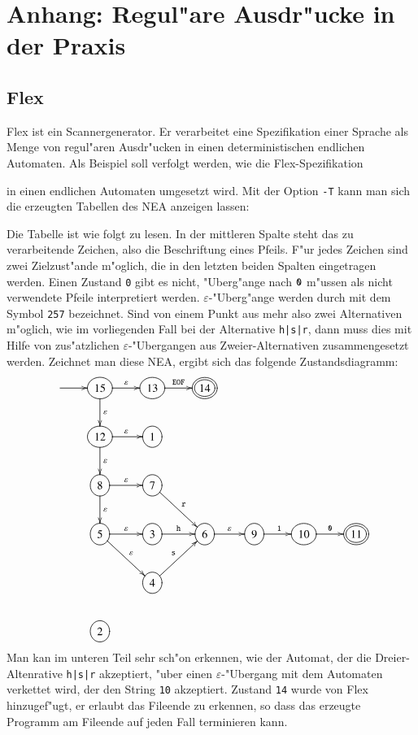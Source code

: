 \section{Anhang: Regul"are Ausdr"ucke in der Praxis\label{regulaer:praxis}}
\subsection{Flex}
Flex ist ein Scannergenerator. Er verarbeitet eine Spezifikation einer
Sprache als Menge von regul"aren Ausdr"ucken in einen deterministischen 
endlichen Automaten. Als Beispiel soll verfolgt werden, wie die
Flex-Spezifikation

in einen endlichen Automaten umgesetzt wird. Mit der Option {\tt -T}
kann man sich die erzeugten Tabellen des NEA anzeigen lassen:

Die Tabelle ist wie folgt zu lesen.
In der mittleren Spalte steht das zu verarbeitende Zeichen, also
die Beschriftung eines Pfeils. F"ur jedes Zeichen sind zwei Zielzust"ande
m"oglich, die in den letzten beiden Spalten eingetragen werden. Einen
Zustand {\tt 0} gibt es nicht, "Uberg"ange nach ${\tt 0}$ m"ussen als
nicht verwendete Pfeile interpretiert werden. $\varepsilon$-"Uberg"ange
werden durch mit dem Symbol {\tt 257} bezeichnet. Sind von einem Punkt
aus mehr also zwei Alternativen m"oglich, wie im vorliegenden Fall
bei der Alternative {\tt h|s|r}, dann muss dies mit Hilfe von zus"atzlichen
$\varepsilon$-"Ubergangen aus Zweier-Alternativen zusammengesetzt werden.
Zeichnet man diese NEA, ergibt sich das folgende Zustandsdiagramm:
\[
\entrymodifiers={++[o][F]}
\xymatrix{
*+\txt{}\ar[r]
	&{15} \ar[r]^{\varepsilon} \ar[d]^{\varepsilon}
		&{13}\ar[r]^{{\tt EOF}}
			&*++[o][F=]{14}
\\
*+\txt{}
	&{12}\ar[d]^{\varepsilon} \ar[r]^{\varepsilon}
		&{1}
\\
*+\txt{}
	&{8}\ar[d]^{\varepsilon} \ar[r]^{\varepsilon}
		&{7}\ar[dr]^{\tt r}
\\
*+\txt{}
	&{5}\ar[dr]^{\varepsilon} \ar[r]^{\varepsilon}
		&{3}\ar[r]^{\tt h}
			&{6}\ar[r]^{\varepsilon}
				&{9}\ar[r]^{\tt 1}
					&{10}\ar[r]^{\tt 0}
						&*++[o][F=]{11}
\\
*+\txt{}
	&*+\txt{}
		&{4}\ar[ur]^{\tt s}
\\
*+\txt{}
	&{2}
}
\]
Man kan im unteren Teil sehr sch"on erkennen, wie der Automat, der
die Dreier-Altenrative {\tt h|s|r} akzeptiert, "uber einen
$\varepsilon$-"Ubergang mit dem Automaten verkettet wird, der 
den String {\tt 10} akzeptiert. Zustand {\tt 14} wurde von Flex
hinzugef"ugt, er erlaubt das Fileende zu erkennen, so dass das
erzeugte Programm am Fileende auf jeden Fall terminieren kann.

